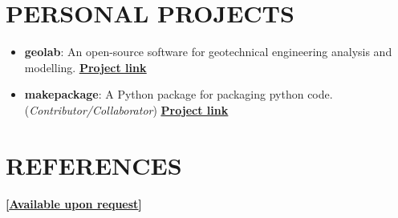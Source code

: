 \documentclass[letterpaper, 12pt]{article}
\newcommand{\cvsection}[1]{
	
	\section*{#1}
}
\begin{document}
	
	\cvsection{PERSONAL PROJECTS}
	
	\begin{itemize}[leftmargin=*]
		
		\item \textbf{geolab}: An open-source software for geotechnical engineering analysis and modelling. \href{https://www.github.com/patrickboateng/geolab}{\underline{\textbf{Project link}}}
		
		\item \textbf{makepackage}: A Python package for packaging python code. (\textit{Contributor/Collaborator})
		\href{https://github.com/nyggus/makepackage}{\underline{\textbf{Project link}}}
		
	\end{itemize}
	
	
	\cvsection{REFERENCES}
	
	\textbf{[\href{mailto:boatengpatrick456@gmail.com}{\underline{Available upon request}}]}
	
	\begin{comment}
	\begin{multicols}{2}
		\textbf{Dr. Jones Owusu Twumasi} \\ [4pt]
		Lecturer, Department of Civil Engineering \\ [4pt]
		Kwame Nkrumah University of Science and Technology \\ [4pt]
		\faEnvelopeSquare \space \href{mailto:jotwumasi@knust.edu.gh}{jotwumasi@knust.edu.gh} \\ [4pt]
		\faPhone \space {+233 244306788} \\ [4pt]
		
		\textbf{Dr. Russel Owusu Afrifa} \\ [4pt]
		Snr. Lecturer, Department of Civil Engineering \\ [4pt]
		Kwame Nkrumah University of Science and Technology \\ [4pt]
		\faEnvelopeSquare \space \href{mailto:roafrifa.coe@knust.edu.gh}{roafrifa.coe@knust.edu.gh} \\ [4pt]
		\faPhone \space {+233 551192818} \\
		
		\columnbreak
		
		\textbf{Ing. Dela Doyen Dakpo} \\ [4pt]
		Project Manager / Structural Engineer \\ [4pt]
		Quatran Services Limited \\ [4pt]
		\faEnvelopeSquare \space \href{mailto:quatranlimited@gmail.com}{quatranlimited@gmail.com}\\[4pt]
		\faPhone \space {+233 247932961} \\ [4pt]

	\end{multicols}
	\end{comment}
	
\end{document}
